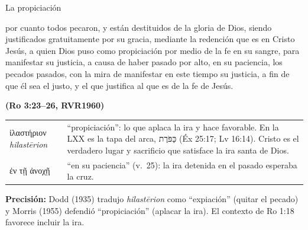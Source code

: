 \documentclass[hyperref={bookmarks=false},aspectratio=169]{beamer}
\newcommand{\heb}[1]{\mbox{\foreignlanguage{hebrew}{#1}}}
\newcommand{\grc}[1]{\foreignlanguage{ancientgreek}{#1}}
\newcommand{\fuente}[1]{\par\hfill{\upshape\bfseries\footnotesize\textcolor{azul}{#1}}}
\newcommand{\precision}[1]{{\footnotesize\color{gris}\textbf{Precisión:} #1}}
\begin{document}
\begin{frame}{La propiciación}
\begin{cita}por cuanto todos pecaron, y están destituidos de la gloria de Dios, siendo justificados gratuitamente por su gracia, mediante la redención que es en Cristo Jesús, a quien Dios puso como propiciación por medio de la fe en su sangre, para manifestar su justicia, a causa de haber pasado por alto, en su paciencia, los pecados pasados, con la mira de manifestar en este tiempo su justicia, a fin de que él sea el justo, y el que justifica al que es de la fe de Jesús.\fuente{(Ro 3:23--26, RVR1960)}\end{cita}
\scriptsize\renewcommand{\arraystretch}{1.2}
\begin{tabular}{@{}>{\RaggedRight\arraybackslash}p{2.6cm}>{\RaggedRight\arraybackslash}p{9.2cm}@{}}
\toprule
\grc{ἱλαστήριον} \emph{hilastērion} & ``propiciación'': lo que aplaca la ira y hace favorable. En la LXX es la tapa del arca, \heb{כַּפֹּרֶת} (Éx 25:17; Lv 16:14). Cristo es el verdadero lugar y sacrificio que satisface la ira santa de Dios. \\
\grc{ἐν τῇ ἀνοχῇ} & ``en su paciencia'' (v.~25): la ira detenida en el pasado esperaba la cruz. \\
\bottomrule
\end{tabular}\par\smallskip
\precision{Dodd (1935) tradujo \emph{hilastērion} como ``expiación'' (quitar el pecado) y Morris (1955) defendió ``propiciación'' (aplacar la ira). El contexto de Ro 1:18 favorece incluir la ira.}
\end{frame}
\end{document}

